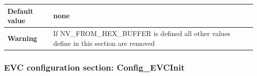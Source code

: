 \documentclass{template/openetcs}
\begin{document}
\begin{itemize}
\begin{longtable}{|l|l|}
					\begin{minipage}[t]{0.22\linewidth} \textbf{Default value}	\end{minipage} 
				&	\begin{minipage}[t]{0.78\linewidth} none \end{minipage} \\
				
				\hline
					\begin{minipage}[t]{0.22\linewidth} \textbf{Warning}	\end{minipage} 
				&	\begin{minipage}[t]{0.78\linewidth} If NV\_FROM\_HEX\_BUFFER is defined all other values define in this section are removed\end{minipage} \\
				
				\hline
				
			\end{longtable}
		
	\end{itemize}
	
\subsubsection{EVC configuration section: Config\_EVCInit}
\end{document}
